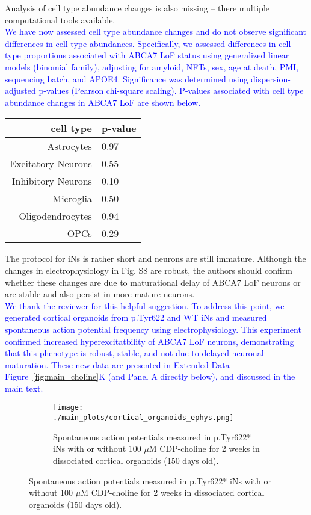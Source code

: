 Analysis of cell type abundance changes is also missing – there multiple computational tools available.\\
\textcolor{blue}{We have now assessed cell type abundance changes and do not observe significant differences in cell type abundances. Specifically, we assessed differences in cell-type proportions associated with ABCA7 LoF status using generalized linear models (binomial family), adjusting for amyloid, NFTs, sex, age at death, PMI, sequencing batch, and APOE4. Significance was determined using dispersion-adjusted p-values (Pearson chi-square scaling). P-values associated with cell type abundance changes in ABCA7 LoF are shown below.}

\begin{table}[H]
	\centering
	\begin{tabular}{rl}
	\toprule
	cell type & p-value \\
	\midrule
	Astrocytes & 0.97 \\
	Excitatory Neurons & 0.55 \\
	Inhibitory Neurons & 0.10 \\
	Microglia & 0.50 \\
	Oligodendrocytes & 0.94 \\
	OPCs & 0.29 \\
	\bottomrule
	\end{tabular}
\end{table}

The protocol for iNs is rather short and neurons are still immature. Although the changes in electrophysiology in Fig. S8 are robust, the authors should confirm whether these changes are due to maturational delay of ABCA7 LoF neurons or are stable and also persist in more mature neurons.\\
\textcolor{blue}{We thank the reviewer for this helpful suggestion. To address this point, we generated cortical organoids from p.Tyr622 and WT iNs and measured spontaneous action potential frequency using electrophysiology. This experiment confirmed increased hyperexcitatbility of ABCA7 LoF neurons, demonstrating that this phenotype is robust, stable, and not due to delayed neuronal maturation. These new data are presented in Extended Data Figure~\ref{fig:main_choline}K (and Panel A directly below), and discussed in the main text.}

\begin{figure}[H]
	\centering
	\begin{subfigure}[t]{.4\textwidth}
	\caption{Spontaneous action potentials measured in p.Tyr622* iNs with or without 100 $\mu$M CDP-choline for 2 weeks in dissociated cortical organoids (150 days old).}
	\texttt{[image: ./main\_plots/cortical\_organoids\_ephys.png]}        
	\end{subfigure}       
\end{figure}

